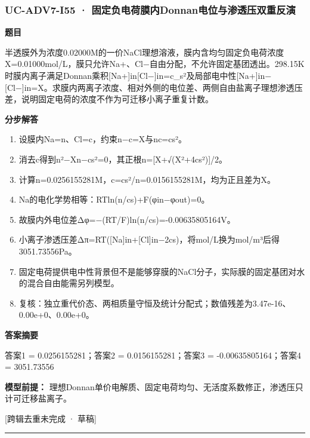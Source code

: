 \documentclass[UTF8,11pt,a4paper]{ctexart}
\begin{document}
\subsubsection*{UC-ADV7-I55 · 固定负电荷膜内Donnan电位与渗透压双重反演}
\noindent\textbf{题目}\par
半透膜外为浓度0.02000M的一价NaCl理想溶液，膜内含均匀固定负电荷浓度X=0.01000mol/L，膜只允许Na+、Cl−自由分配，不允许固定基团透出。298.15K时膜内离子满足Donnan乘积[Na+]in[Cl−]in=c\_s²及局部电中性[Na+]in−[Cl−]in=X。求膜内两离子浓度、相对外侧的电位差、两侧自由盐离子理想渗透压差，说明固定电荷的浓度不作为可迁移小离子重复计数。\par
\medskip\noindent\textbf{分步解答}
\begin{enumerate}
\item 设膜内Na=n、Cl=c，约束n−c=X与nc=cs²。
\item 消去c得到n²−Xn−cs²=0，其正根n=[X+√(X²+4cs²)]/2。
\item 计算n=0.0256155281M，c=cs²/n=0.0156155281M，均为正且差为X。
\item Na的电化学势相等：RTln(n/cs)+F(φin−φout)=0。
\item 故膜内外电位差Δφ=−(RT/F)ln(n/cs)=-0.00635805164V。
\item 小离子渗透压差Δπ=RT([Na]in+[Cl]in−2cs)，将mol/L换为mol/m³后得3051.73556Pa。
\item 固定电荷提供电中性背景但不是能够穿膜的NaCl分子，实际膜的固定基团对水的混合自由能需另列模型。
\item 复核：独立重代价态、两相质量守恒及统计分配式；数值残差为3.47e-16、0.00e+0、0.00e+0。
\end{enumerate}
\noindent\textbf{答案摘要}\par
答案1 = 0.0256155281；答案2 = 0.0156155281；答案3 = -0.00635805164；答案4 = 3051.73556\par
\noindent\textbf{模型前提：}
理想Donnan单价电解质、固定电荷均匀、无活度系数修正，渗透压只计可迁移盐离子。\par
\noindent\textcolor{red!65!black}{[跨辑去重未完成 · 草稿]} \par
\medskip\hrule\medskip
{}
\end{document}
